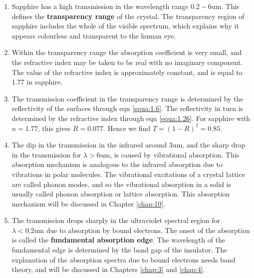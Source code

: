 \documentclass[12pt]{book}
\def\um{\mathrm{um}}
\begin{document}
\begin{enumerate}
  \item Sapphire has a high transmission in the wavelength range $0.2-6\um$. This defines the \textbf{transparency range} of the crystal. The transparency region of sapphire includes the whole of the visible spectrum, which explains why it appears colourless and transparent to the human eye.
  \item Within the transparency range the absorption coefficient is very small, and the refractive index may be taken to be real with no imaginary component. The value of the refractive index is approximately constant, and is equal to 1.77 in sapphire.
  \item The transmission coefficient in the transparency range is determined by the reflectivity of the surfaces through eqn \ref{equa:1.6}. The reflectivity in turn is determined by the refractive index through eqn \ref{equa:1.26}. For sapphire with $n = 1.77$, this gives $R = 0.077$. Hence we find $T = (1 - R)^2 = 0.85$.
  \item The dip in the transmission in the infrared around $3\um$, and the sharp drop in the transmission for $\lambda > 6\um$, is caused by vibrational absorption. This absorption mechanism is analogous to the infrared absorption due to vibrations in polar molecules. The vibrational excitations of a crystal lattice are called phonon modes, and so the vibrational absorption in a solid is usually called phonon absorption or lattice absorption. This absorption mechanism will be discussed in Chapter \ref{chap:10}. 
  \item The transmission drops sharply in the ultraviolet spectral region for $\lambda<0.2\um$ due to absorption by bound electrons. The onset of the absorption is called the \textbf{fundamental absorption edge}. The wavelength of the fundamental edge is determined by the band gap of the insulator. The explanation of the absorption spectra due to bound electrons needs band theory, and will be discussed in Chapters \ref{chap:3} and \ref{chap:4}.
\end{enumerate}
\end{document}
